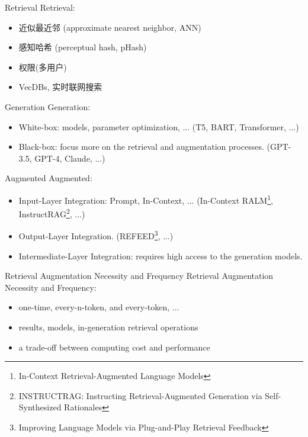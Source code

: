 \documentclass{beamer}
\begin{document}
\begin{frame}{Retrieval}
    Retrieval:
    \begin{itemize}
        \item 近似最近邻 (approximate nearest neighbor, ANN)
        \item 感知哈希 (perceptual hash, pHash)
        \item 权限(多用户)
        \item VecDBs, 实时联网搜索
    \end{itemize}
\end{frame}

\begin{frame}{Generation}
    Generation:
    \begin{itemize}
        \item White-box: models, parameter optimization, ... (T5, BART, Transformer, ...)
        \item Black-box: focus more on the retrieval and augmentation processes. (GPT-3.5, GPT-4, Claude, ...)
    \end{itemize}
\end{frame}

\begin{frame}{Augmented}
    Augmented:
    \begin{itemize}
        \item Input-Layer Integration: Prompt, In-Context, ... (In-Context RALM\footnote{In-Context Retrieval-Augmented Language Models}, InstructRAG\footnote{INSTRUCTRAG: Instructing Retrieval-Augmented Generation via Self-Synthesized Rationales}, ...)
        \item Output-Layer Integration. (REFEED\footnote{Improving Language Models via Plug-and-Play Retrieval Feedback}, ...)
        \item Intermediate-Layer Integration: requires high access to the generation models.
    \end{itemize}
\end{frame}

\begin{frame}{Retrieval Augmentation Necessity and Frequency}
    Retrieval Augmentation Necessity and Frequency: 
    \begin{itemize}
        \item one-time, every-n-token, and every-token, ...
        \item results, models, in-generation retrieval operations
        \item a trade-off between computing cost and performance
    \end{itemize}
\end{frame}
\end{document}
